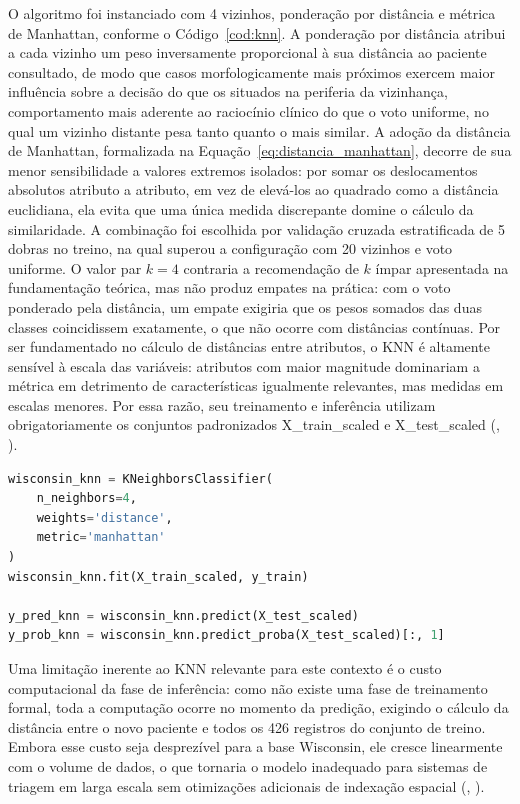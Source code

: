 \documentclass[
    12pt
    ,oneside
    ,a4paper
    ,chapter=TITLE
    ,section=TITLE
    ,sumario=abnt-6027-2012
    ,english,brazil]{abntex2} %
\begin{document}
O algoritmo foi instanciado com 4 vizinhos, ponderação por distância e métrica
de Manhattan, conforme o Código~\ref{cod:knn}. A ponderação por distância
atribui a cada vizinho um peso inversamente proporcional à sua distância ao
paciente consultado, de modo que casos morfologicamente mais próximos exercem
maior influência sobre a decisão do que os situados na periferia da vizinhança,
 comportamento mais aderente ao raciocínio clínico do que o voto uniforme, no
qual um vizinho distante pesa tanto quanto o mais similar. A adoção da distância
de Manhattan, formalizada na Equação~\ref{eq:distancia_manhattan}, decorre de
sua menor sensibilidade a valores extremos isolados: por somar os deslocamentos
absolutos atributo a atributo, em vez de elevá-los ao quadrado como a distância
euclidiana, ela evita que uma única medida discrepante domine o cálculo da
similaridade. A combinação foi escolhida por validação cruzada estratificada de
5 dobras no treino, na qual superou a configuração com 20 vizinhos e voto
uniforme. O valor par $k = 4$ contraria a recomendação de $k$ ímpar apresentada
na fundamentação teórica, mas não produz empates na prática: com o voto
ponderado pela distância, um empate exigiria que os pesos somados das duas
classes coincidissem exatamente, o que não ocorre com distâncias contínuas.
Por ser fundamentado no cálculo de distâncias entre atributos, o
KNN é altamente sensível à escala das variáveis: atributos com maior magnitude
dominariam a métrica em detrimento de características igualmente relevantes,
mas medidas em escalas menores. Por essa razão, seu treinamento e inferência
utilizam obrigatoriamente os conjuntos padronizados X\_train\_scaled e
X\_test\_scaled (, \citeyear{Bishop2006}).

\begin{codigo}[htb]
\begin{lstlisting}[language=Python]
wisconsin_knn = KNeighborsClassifier(
    n_neighbors=4,
    weights='distance',
    metric='manhattan'
)
wisconsin_knn.fit(X_train_scaled, y_train)

y_pred_knn = wisconsin_knn.predict(X_test_scaled)
y_prob_knn = wisconsin_knn.predict_proba(X_test_scaled)[:, 1]
\end{lstlisting}
\fonteautor
\end{codigo}

Uma limitação inerente ao KNN relevante para este contexto é o custo
computacional da fase de inferência: como não existe uma fase de treinamento
formal, toda a computação ocorre no momento da predição, exigindo o cálculo
da distância entre o novo paciente e todos os 426 registros do conjunto de
treino. Embora esse custo seja desprezível para a base Wisconsin, ele cresce
linearmente com o volume de dados, o que tornaria o modelo inadequado para
sistemas de triagem em larga escala sem otimizações adicionais de indexação
espacial (, \citeyear{Faceli2011}).
\end{document}
